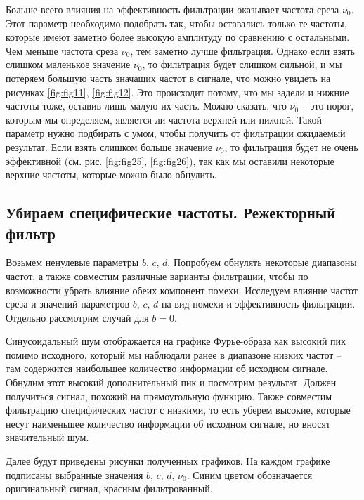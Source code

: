 \documentclass[a4paper, 12pt]{article}
\begin{document}
    Больше всего влияния на эффективность фильтрации оказывает частота среза $\nu_0$. Этот параметр необходимо подобрать
    так, чтобы оставались только те частоты, которые имеют заметно более высокую амплитуду по сравнению с остальными.
    Чем меньше частота среза $\nu_0$, тем заметно лучше фильтрация. Однако если взять слишком маленькое значение $\nu_0$,
    то фильтрация будет слишком сильной, и мы потеряем большую часть значащих частот в сигнале, что можно увидеть на рисунках
    \ref{fig:fig11}, \ref{fig:fig12}. Это происходит потому, что мы задели и нижние частоты тоже, оставив лишь малую их часть. Можно сказать, что
    $\nu_0$ -- это порог, которым мы определяем, является ли частота верхней или нижней. Такой параметр нужно подбирать с умом, чтобы
    получить от фильтрации ожидаемый результат. Если взять слишком больше значение $\nu_0$, то фильтрация будет не очень эффективной
    (см. рис. \ref{fig:fig25}, \ref{fig:fig26}), так как мы оставили некоторые верхние частоты, которые можно было обнулить.


    \subsection{Убираем специфические частоты. Режекторный фильтр}
    Возьмем ненулевые параметры $b,\,c,\,d$. Попробуем
    обнулять некоторые диапазоны частот, а также
    совместим различные варианты фильтрации, чтобы по возможности убрать влияние обеих компонент помехи.
    Исследуем влияние частот среза и значений параметров $b,\,c,\,d$ на вид помехи и эффективность
    фильтрации. Отдельно рассмотрим случай для $b=0$.


    Синусоидальный шум отображается на графике Фурье-образа как высокий пик помимо исходного, который мы наблюдали ранее в диапазоне низких частот
    -- там содержится наибольшее количество информации об исходном сигнале. Обнулим этот высокий дополнительный пик и посмотрим результат. Должен
    получиться сигнал, похожий на прямоугольную функцию. Также совместим фильтрацию специфических частот с низкими, то есть уберем высокие, которые
    несут наименьшее количество информации об исходном сигнале, но вносят значительный шум.


    Далее будут приведены рисунки полученных графиков. На каждом графике подписаны выбранные значения $b,\,c,\,d,\,\nu_0$. 
    Синим цветом обозначается оригинальный сигнал, красным фильтрованный. 
\end{document}
